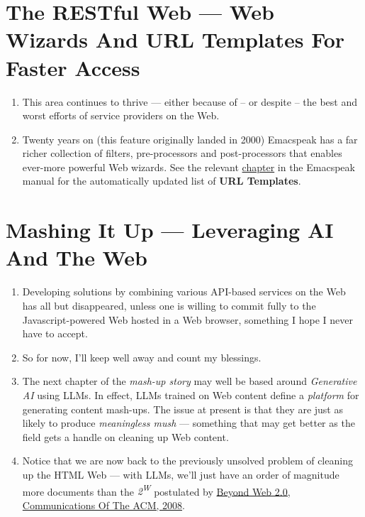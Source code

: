 \documentclass[11pt]{article}
\begin{document}
\section{The RESTful Web —  Web Wizards And URL Templates For Faster Access}
\label{sec:org9dd76e3}

\begin{enumerate}
\item This area continues to thrive --- either because of -- or
despite -- the best and worst efforts of service providers on the
Web.
\item Twenty years on (this feature originally landed in 2000)
Emacspeak has a far richer collection of filters, pre-processors
and post-processors
 that enables ever-more powerful Web
wizards. See the relevant \href{https://tvraman.github.io/emacspeak/manual/URL-Templates.html}{chapter} in the Emacspeak manual for the
automatically updated list of \textbf{URL Templates}.
\end{enumerate}
\section{Mashing It Up —  Leveraging  AI And The Web}
\label{sec:orga6c4235}

\begin{enumerate}
\item Developing solutions by combining various API-based services on
the Web has all but disappeared, unless one is willing to commit
fully to the Javascript-powered Web hosted in a Web browser,
something I hope I never have to accept.
\item So for now, I'll keep
well away and count my blessings.
\item The next chapter of the \emph{mash-up story} may well be based around
 \emph{Generative AI} using LLMs. In effect, LLMs trained on   Web content 
define a \emph{platform} for generating content mash-ups.  The issue
at present is that they are just as  likely  to produce
\emph{meaningless mush} ---
something that may  get better as the field gets a
handle on cleaning up  Web content.
\item Notice that we are now back to the previously unsolved problem
of cleaning up the  HTML Web --- with LLMs, we'll just
have an order of magnitude more documents than the \emph{2\textsuperscript{W}} postulated
 by  \href{https://research.google/blog/beyond-web-20/?hl=in\&m=1}{Beyond Web 2.0, Communications
Of The ACM, 2008}.
\end{enumerate}
\end{document}
